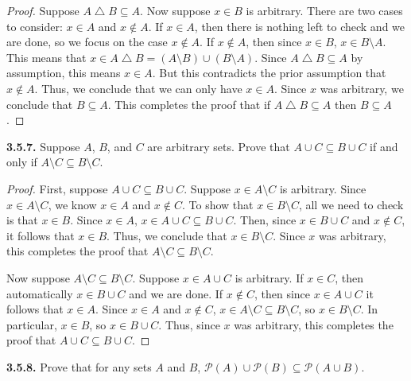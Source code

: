 \documentclass[12pt]{amsart}
\newenvironment{statement}[1]{\smallskip\noindent\color[rgb]{.6627, .3529, .6314} {\bf #1.}}{}
\theoremstyle{definition}
\theoremstyle{remark}
\newcommand{\powerset}[1]{\mathscr{P} \left( #1 \right)}
\begin{document}
\begin{proof}
Suppose $A \bigtriangleup B \subseteq A$.
Now suppose $x \in B$ is arbitrary.
There are two cases to consider: $x \in A$ and $x \notin A$.
If $x \in A$, then there is nothing left to check and we are done, so we focus on the case $x \notin A$.
If $x \notin A$, then since $x \in B$, $x \in B \setminus A$.
This means that $x \in A \bigtriangleup B = (A \setminus B) \cup (B \setminus A)$.
Since $A \bigtriangleup B \subseteq A$ by assumption, this means $x \in A$.
But this contradicts the prior assumption that $x \notin A$.
Thus, we conclude that we can only have $x \in A$.
Since $x$ was arbitrary, we conclude that $B \subseteq A$.
This completes the proof that if $A \bigtriangleup B \subseteq A$ then $B \subseteq A$.
\end{proof}


\begin{statement}{3.5.7}
Suppose $A$, $B$, and $C$ are arbitrary sets.
Prove that $A \cup C \subseteq B \cup C$ if and only if $A \setminus C \subseteq B \setminus C$.
\end{statement}

\begin{proof}
First, suppose $A \cup C \subseteq B \cup C$.
Suppose $x \in A \setminus C$ is arbitrary.
Since $x \in A \setminus C$, we know $x \in A$ and $x \notin C$.
To show that $x \in B \setminus C$, all we need to check is that $x \in B$.
Since $x \in A$, $x \in A \cup C \subseteq B \cup C$.
Then, since $x \in B \cup C$ and $x \notin C$, it follows that $x \in B$.
Thus, we conclude that $x \in B \setminus C$.
Since $x$ was arbitrary, this completes the proof that $A \setminus C \subseteq B \setminus C$.

Now suppose $A \setminus C \subseteq B \setminus C$.
Suppose $x \in A \cup C$ is arbitrary.
If $x \in C$, then automatically $x \in B \cup C$ and we are done.
If $x \notin C$, then since $x \in A \cup C$ it follows that $x \in A$.
Since $x \in A$ and $x \notin C$, $x \in A \setminus C \subseteq B \setminus C$, so $x \in B \setminus C$.
In particular, $x \in B$, so $x \in B \cup C$.
Thus, since $x$ was arbitrary, this completes the proof that $A \cup C \subseteq B \cup C$.
\end{proof}


\begin{statement}{3.5.8}
Prove that for any sets $A$ and $B$, $\powerset{A} \cup \powerset{B} \subseteq \powerset{A \cup B}$.
\end{statement}
\end{document}
